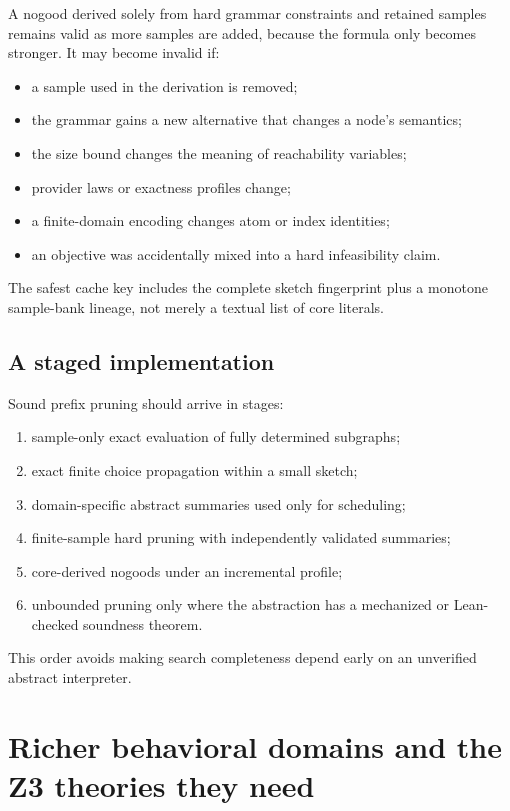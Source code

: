 \documentclass[10pt,letterpaper,oneside]{report}
\begin{document}
A nogood derived solely from hard grammar constraints and retained samples remains valid as more samples are added, because the formula only becomes stronger. It may become invalid if:

\begin{itemize}
\item a sample used in the derivation is removed;
\item the grammar gains a new alternative that changes a node's semantics;
\item the size bound changes the meaning of reachability variables;
\item provider laws or exactness profiles change;
\item a finite-domain encoding changes atom or index identities;
\item an objective was accidentally mixed into a hard infeasibility claim.
\end{itemize}

The safest cache key includes the complete sketch fingerprint plus a monotone sample-bank lineage, not merely a textual list of core literals.

\section{A staged implementation}

Sound prefix pruning should arrive in stages:

\begin{enumerate}
\item sample-only exact evaluation of fully determined subgraphs;
\item exact finite choice propagation within a small sketch;
\item domain-specific abstract summaries used only for scheduling;
\item finite-sample hard pruning with independently validated summaries;
\item core-derived nogoods under an incremental profile;
\item unbounded pruning only where the abstraction has a mechanized or Lean-checked soundness theorem.
\end{enumerate}

This order avoids making search completeness depend early on an unverified abstract interpreter.

\chapter{Richer behavioral domains and the Z3 theories they need}
\label{chap:richer-domains}
\end{document}
